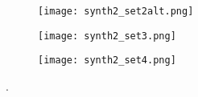 \documentclass[12pt]{article}
\begin{document}
\begin{enumerate}
\begin{figure}[h!]
\begin{center}
\texttt{[image: synth2\_set2alt.png]}
\end{center}
\end{figure}

\pagebreak%
\begin{figure}[h!]
\begin{center}
\texttt{[image: synth2\_set3.png]}
\end{center}
\end{figure}

\begin{figure}[h!]
\begin{center}
\texttt{[image: synth2\_set4.png]}
\end{center}
\end{figure}



\end{enumerate}

.
\end{document}
